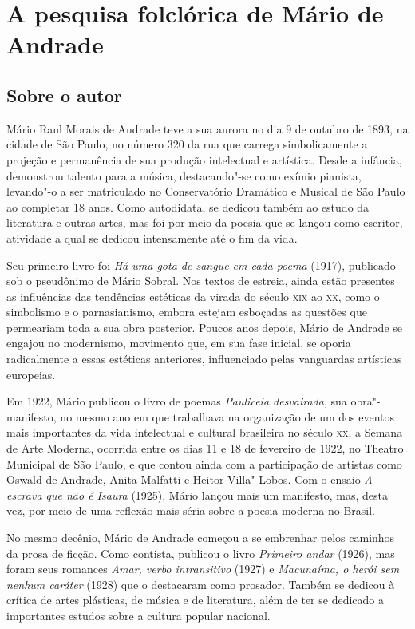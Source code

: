 \chapter{A pesquisa folclórica de Mário de Andrade}

\section{Sobre o autor}

\noindent{}Mário Raul Morais de Andrade teve a sua aurora no dia 9 de outubro de
1893, na cidade de São Paulo, no número 320 da rua que carrega
simbolicamente a projeção e permanência de sua produção intelectual e
artística. Desde a infância, demonstrou talento para a música,
destacando"-se como exímio pianista, levando"-o a ser matriculado no
Conservatório Dramático e Musical de São Paulo ao completar 18 anos.
Como autodidata, se dedicou também ao estudo da literatura e outras
artes, mas foi por meio da poesia que se lançou como escritor, atividade
a qual se dedicou intensamente até o fim da vida.

Seu primeiro livro foi \emph{Há uma gota de sangue em cada poema}
(1917), publicado sob o pseudônimo de Mário Sobral. Nos textos de
estreia, ainda estão presentes as influências das tendências estéticas
da virada do século \textsc{xix} ao \textsc{xx}, como o simbolismo e o parnasianismo,
embora estejam esboçadas as questões que permeariam toda a sua obra
posterior. Poucos anos depois, Mário de Andrade se engajou no
modernismo, movimento que, em sua fase inicial, se oporia radicalmente a
essas estéticas anteriores, influenciado pelas vanguardas artísticas
europeias.

Em 1922, Mário publicou o livro de poemas \emph{Pauliceia desvairada},
sua obra"-manifesto, no mesmo ano em que trabalhava na organização de um
dos eventos mais importantes da vida intelectual e cultural brasileira
no século \textsc{xx}, a Semana de Arte Moderna, ocorrida entre os dias 11 e 18
de fevereiro de 1922, no Theatro Municipal de São Paulo, e que contou
ainda com a participação de artistas como Oswald de Andrade, Anita
Malfatti e Heitor Villa"-Lobos. Com o ensaio \emph{A escrava que não é
Isaura} (1925), Mário lançou mais um manifesto, mas, desta vez, por meio
de uma reflexão mais séria sobre a poesia moderna no Brasil.

No mesmo decênio, Mário de Andrade começou a se embrenhar pelos caminhos
da prosa de ficção. Como contista, publicou o livro \emph{Primeiro
andar} (1926), mas foram seus romances \emph{Amar, verbo intransitivo}
(1927) e \emph{Macunaíma, o herói sem nenhum caráter} (1928) que o
destacaram como prosador. Também se dedicou à crítica de artes
plásticas, de música e de literatura, além de ter se dedicado a
importantes estudos sobre a cultura popular nacional.


